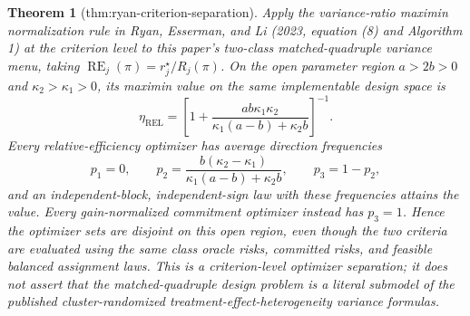 \documentclass{article}
\newtheorem{theorem}{Theorem}
\begin{document}
\begin{theorem}[thm:ryan-criterion-separation]\label{thm:ryan-criterion-separation}
Apply the variance-ratio maximin normalization rule in Ryan, Esserman, and Li (2023, equation (8) and Algorithm 1) at the criterion level to this paper's two-class matched-quadruple variance menu, taking \(\operatorname{RE}_j(\pi)=r_j^\star/R_j(\pi)\). On the open parameter region \(a>2b>0\) and \(\kappa_2>\kappa_1>0\), its maximin value on the same implementable design space is
\[
\eta_{\mathrm{REL}}=\left[1+\frac{ab\kappa_1\kappa_2}{\kappa_1(a-b)+\kappa_2b}\right]^{-1}.
\]
Every relative-efficiency optimizer has average direction frequencies
\[
p_1=0,\qquad
p_2=\frac{b(\kappa_2-\kappa_1)}{\kappa_1(a-b)+\kappa_2b},\qquad
p_3=1-p_2,
\]
and an independent-block, independent-sign law with these frequencies attains the value. Every gain-normalized commitment optimizer instead has \(p_3=1\). Hence the optimizer sets are disjoint on this open region, even though the two criteria are evaluated using the same class oracle risks, committed risks, and feasible balanced assignment laws. This is a criterion-level optimizer separation; it does not assert that the matched-quadruple design problem is a literal submodel of the published cluster-randomized treatment-effect-heterogeneity variance formulas.
\end{theorem}
\end{document}
